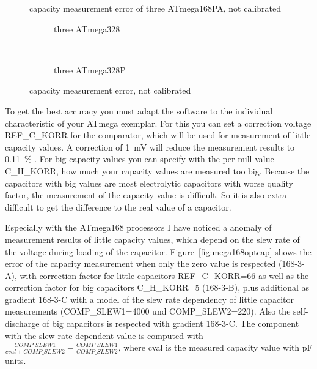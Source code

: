 \begin{figure}[H]
\centering

\caption{capacity measurement error of three ATmega168PA, not calibrated}
\label{fig:mega168PAall}
\end{figure}

\begin{figure}[H]
  \begin{subfigure}[b]{9cm}
    \centering
    \resizebox{9cm}{!}{}
    \caption{three ATmega328}
    \label{fig:mega328all}
  \end{subfigure}
  ~
  \begin{subfigure}[b]{9cm}
    \centering
    \resizebox{9cm}{!}{}
    \caption{three ATmega328P}
    \label{fig:mega328Pall}
  \end{subfigure}
\caption{capacity measurement error, not calibrated}
\end{figure}

To get the best accuracy you must adapt the software to the individual characteristic of your ATmega exemplar.
For this you can set a correction voltage REF\_C\_KORR for the comparator, which will be used for measurement of little capacity values.
A correction of 1~mV will reduce the measurement results to 0.11~\% .
For big capacity values you can specify with the per mill value C\_H\_KORR, how much your capacity values are measured too big.
Because the capacitors with big values are most electrolytic capacitors with worse quality factor, the measurement of
the capacity value is difficult. So it is also extra difficult to get the difference to the real value of a capacitor.

Especially with the ATmega168 processors I have noticed a anomaly of measurement results of little capacity values,
which depend on the slew rate of the voltage during loading of the capacitor.
Figure~\ref{fig:mega168optcap} shows the error of the capacity measurement when only the zero value is respected
(168-3-A), with correction factor for little capacitors REF\_C\_KORR=66 as well as the correction factor for big
capacitors C\_H\_KORR=5 (168-3-B), plus additional as gradient 168-3-C  with a model of the slew rate dependency of little capacitor 
measurements (COMP\_SLEW1=4000 und COMP\_SLEW2=220). Also the self-discharge of big capacitors is respected with gradient 168-3-C.
The component with the slew rate dependent value is computed with \(\frac{COMP\_SLEW1}{cval+COMP\_SLEW2} - \frac{COMP\_SLEW1}{COMP\_SLEW2}\),
where cval is the measured capacity value with pF units.

